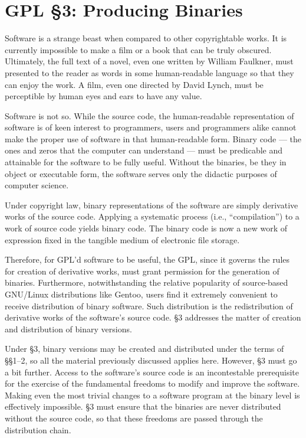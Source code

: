 \documentclass[11pt, letterpaper]{book}
\begin{document}
\section{GPL \S 3: Producing Binaries}
\label{GPL-Section-3}

Software is a strange beast when compared to other copyrightable works.
It is currently impossible to make a film or a book that can be truly
obscured. Ultimately, the full text of a novel, even one written by
William Faulkner, must presented to the reader as words in some
human-readable language so that they can enjoy the work. A film, even one
directed by David Lynch, must be perceptible by human eyes and ears to
have any value.

Software is not so. While the source code, the human-readable
representation of software is of keen interest to programmers, users and
programmers alike cannot make the proper use of software in that
human-readable form. Binary code --- the ones and zeros that the computer
can understand --- must be predicable and attainable for the software to
be fully useful. Without the binaries, be they in object or executable
form, the software serves only the didactic purposes of computer science.

Under copyright law, binary representations of the software are simply
derivative works of the source code. Applying a systematic process (i.e.,
``compilation'') to a work of source code yields binary code. The binary
code is now a new work of expression fixed in the tangible medium of
electronic file storage.

Therefore, for GPL'd software to be useful, the GPL, since it governs the
rules for creation of derivative works, must grant permission for the
generation of binaries. Furthermore, notwithstanding the relative
popularity of source-based GNU/Linux distributions like Gentoo, users find
it extremely convenient to receive distribution of binary software. Such
distribution is the redistribution of derivative works of the software's
source code. \S 3 addresses the matter of creation and distribution of
binary versions.

Under \S 3, binary versions may be created and distributed under the
terms of \S\S 1--2, so all the material previously discussed applies
here. However, \S 3 must go a bit further. Access to the software's
source code is an incontestable prerequisite for the exercise of the
fundamental freedoms to modify and improve the software. Making even
the most trivial changes to a software program at the binary level is
effectively impossible. \S 3 must ensure that the binaries are never
distributed without the source code, so that these freedoms are passed
through the distribution chain.
\end{document}
